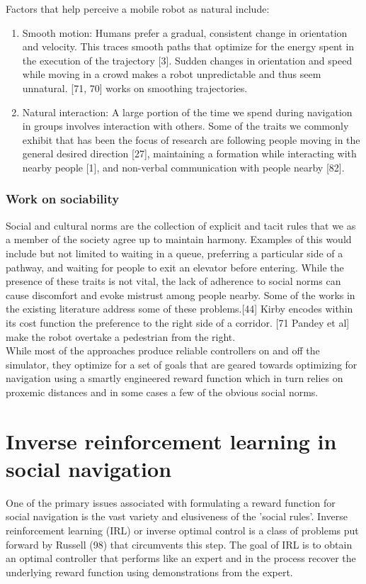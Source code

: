 Factors that help perceive a mobile robot as natural include:
\begin{enumerate}
    \item Smooth motion: Humans prefer a gradual, consistent change in orientation and velocity. This traces smooth paths that optimize for the energy spent in the execution of the trajectory [3]. Sudden changes in orientation and speed while moving in a crowd makes a robot unpredictable and thus seem unnatural. [71, 70] works on smoothing trajectories.
    \item Natural interaction: A large portion of the time we spend during navigation in groups involves interaction with others. Some of the traits we commonly exhibit that has been the focus of research are following people moving in the general desired direction [27], maintaining a formation while interacting with nearby people [1], and non-verbal communication with people nearby [82]. 
    
\end{enumerate}

\subsubsection{Work on sociability}
Social and cultural norms are the collection of explicit and tacit rules that we as a member of the society agree up to maintain harmony. Examples of this would include but not limited to waiting in a queue, preferring a particular side of a pathway, and waiting for people to exit an elevator before entering. While the presence of these traits is not vital, the lack of adherence to social norms can cause discomfort and evoke mistrust among people nearby. Some of the works in the existing literature address some of these problems.[44] Kirby encodes within its cost function the preference to the right side of a corridor. [71 Pandey et al] make the robot overtake a pedestrian from the right.\\

While most of the approaches produce reliable controllers on and off the simulator, they optimize for a set of goals that are geared towards optimizing for navigation using a smartly engineered reward function which in turn relies on proxemic distances and in some cases a few of the obvious social norms.\\

\section{Inverse reinforcement learning in social navigation}
One of the primary issues associated with formulating a reward function for social navigation is the vast variety and elusiveness of the 'social rules'. Inverse reinforcement learning (IRL) or inverse optimal control is a class of problems put forward by Russell (98) that circumvents this step. The goal of IRL is to obtain an optimal controller that performs like an expert and in the process recover the underlying reward function using demonstrations from the expert. \\

